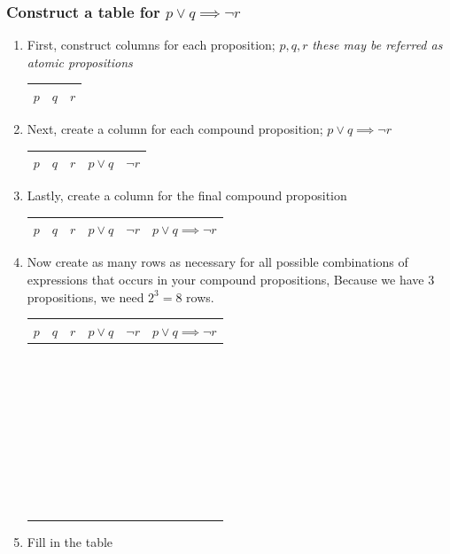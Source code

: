 \documentclass{article}
\begin{document}
\subsubsection{Construct a table for $ p \lor q \implies \neg r $}
\begin{enumerate}
	\item First, construct columns for each proposition; $ p,q,r $ \textit{these may be referred as atomic propositions} \\
		

		\begin{tabular}{|c|c|c|}
			\hline
			$ p $ & $ q $ & $ r $ \\
			\hline
		\end{tabular}
	\item Next, create a column for each compound proposition; $ p \lor q \implies \neg r $ \\
		

		\begin{tabular}{|c|c|c|c|c|}
			\hline
			$ p $ & $ q $ & $ r $ & $ p \lor q $ & $ \neg r $ \\
			\hline
		\end{tabular}
	\item Lastly, create a column for the final compound proposition \\
		

		\begin{tabular}{|c|c|c|c|c|c|}
			\hline
			$ p $ & $ q $ & $ r $ & $ p \lor q $ & $ \neg r $ & $ p \lor q \implies \neg r $\\
			\hline
		\end{tabular}
	\item Now create as many rows as necessary for all possible combinations of expressions that occurs in your compound propositions, Because we have 3 propositions, we need $2^3 = 8$ rows. \\


		\begin{tabular}{|c|c|c|c|c|c|}
			\hline
			$ p $ & $ q $ & $ r $ & $ p \lor q $ & $ \neg r $ & $ p \lor q \implies \neg r $\\
			\hline
			$ $ & $ $ & $ $ & $ $ & $ $ & $ $\\
			$ $ & $ $ & $ $ & $ $ & $ $ & $ $\\
			$ $ & $ $ & $ $ & $ $ & $ $ & $ $\\
			$ $ & $ $ & $ $ & $ $ & $ $ & $ $\\
			$ $ & $ $ & $ $ & $ $ & $ $ & $ $\\
			$ $ & $ $ & $ $ & $ $ & $ $ & $ $\\
			$ $ & $ $ & $ $ & $ $ & $ $ & $ $\\
			$ $ & $ $ & $ $ & $ $ & $ $ & $ $\\
			\hline
		\end{tabular}
	\item Fill in the table \\



\end{enumerate}
\end{document}
